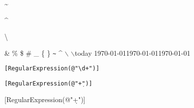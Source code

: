 \documentclass{scrbook}
\begin{document}
\textasciitilde

\textasciicircum

\textbackslash

\& \% \$ \# \_ \{  \} \texttt{\~{}} \^{} $\backslash$ $\backslash$today
\newline
\today \newline \today \newline \today

\verb|[RegularExpression(@"\d+")]|

\texttt{[RegularExpression(@"\string\d+")]}

\textsf{[RegularExpression(@"\string\d+")]}
\end{document}
